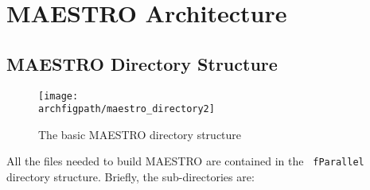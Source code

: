 \section{MAESTRO Architecture}

\subsection{MAESTRO Directory Structure}

\begin{figure}[h]
\centering
\texttt{[image: \\archfigpath/maestro\_directory2]}
\caption{The basic MAESTRO directory structure}
\end{figure}

All the files needed to build MAESTRO are contained in the {\tt
fParallel} directory structure.  Briefly, the sub-directories
are:

